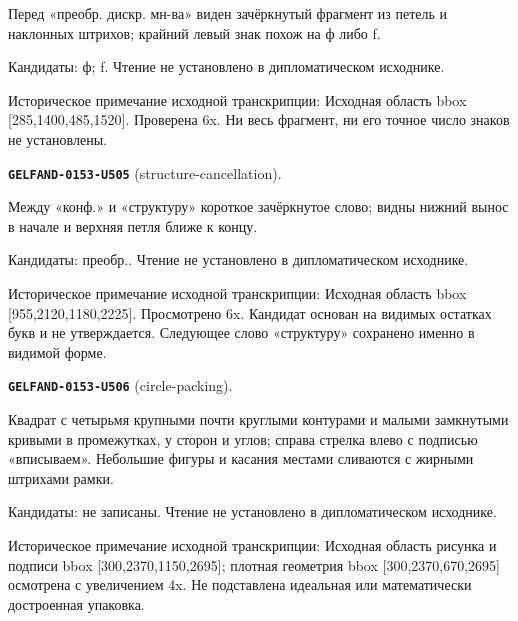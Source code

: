 Перед «преобр. дискр. мн-ва» виден зачёркнутый фрагмент из петель и наклонных штрихов; крайний левый знак похож на ф либо f.\par
Кандидаты: ф; f. Чтение не установлено в дипломатическом исходнике.\par
Историческое примечание исходной транскрипции: Исходная область bbox [285,1400,485,1520]. Проверена 6x. Ни весь фрагмент, ни его точное число знаков не установлены.\par\medskip
\par\noindent\leavevmode{}\label{GELFAND-0153-U505}\textbf{\texttt{GELFAND-0153-U505}} (structure-cancellation).\nopagebreak[4]\par
Между «конф.» и «структуру» короткое зачёркнутое слово; видны нижний вынос в начале и верхняя петля ближе к концу.\par
Кандидаты: преобр.. Чтение не установлено в дипломатическом исходнике.\par
Историческое примечание исходной транскрипции: Исходная область bbox [955,2120,1180,2225]. Просмотрено 6x. Кандидат основан на видимых остатках букв и не утверждается. Следующее слово «структуру» сохранено именно в видимой форме.\par\medskip
\par\noindent\leavevmode{}\label{GELFAND-0153-U506}\textbf{\texttt{GELFAND-0153-U506}} (circle-packing).\nopagebreak[4]\par
Квадрат с четырьмя крупными почти круглыми контурами и малыми замкнутыми кривыми в промежутках, у сторон и углов; справа стрелка влево с подписью «вписываем». Небольшие фигуры и касания местами сливаются с жирными штрихами рамки.\par
Кандидаты: не записаны. Чтение не установлено в дипломатическом исходнике.\par
Историческое примечание исходной транскрипции: Исходная область рисунка и подписи bbox [300,2370,1150,2695]; плотная геометрия bbox [300,2370,670,2695] осмотрена с увеличением 4x. Не подставлена идеальная или математически достроенная упаковка.\par\medskip
